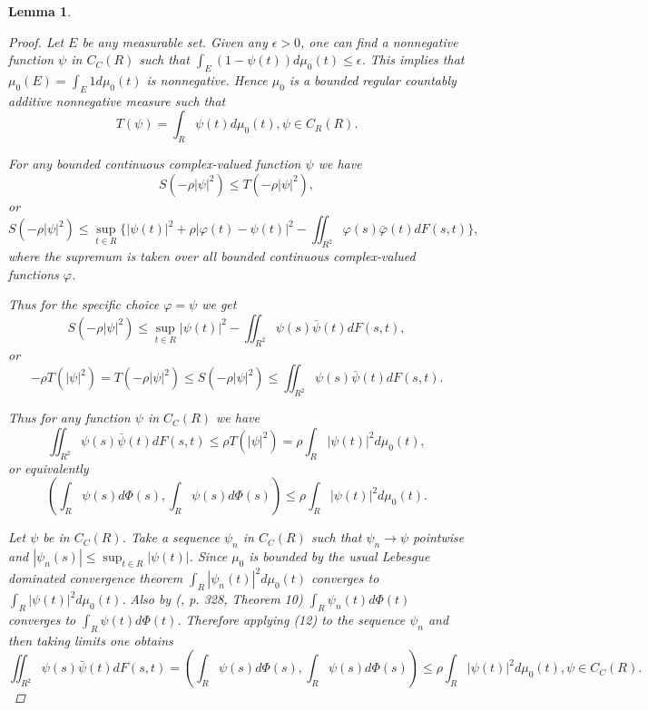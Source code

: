 \documentclass{article}
\newtheorem{lemma}[theorem]{Lemma}
\begin{document}
\begin{lemma}
\begin{enumerate}
\begin{proof}
Let $E$ be any measurable set. Given any $\epsilon > 0$, one can find a nonnegative function $\psi$ in $C_C(R)$ such that $\int_{E} (1 - \psi(t)) d\mu_0(t) \leq \epsilon$. This implies that $\mu_0(E) = \int_{E} 1 d\mu_0(t)$ is nonnegative. Hence $\mu_0$ is a bounded regular countably additive nonnegative measure such that
\begin{equation}
T(\psi) = \int_{R} \psi(t) d\mu_0(t), \psi \in C_R(R).
\end{equation}

For any bounded continuous complex-valued function $\psi$ we have
\begin{equation}
S(-\rho|\psi|^2) \leq T(-\rho|\psi|^2),
\end{equation}
or
\begin{equation}
S(-\rho|\psi|^2) \leq \sup_{t \in R} \{|\psi(t)|^2 + \rho|\varphi(t) - \psi(t)|^2 - \iint_{R^{2}} \varphi(s) \bar{\varphi}(t) d F(s, t)\},
\end{equation}
where the supremum is taken over all bounded continuous complex-valued functions $\varphi$.

Thus for the specific choice $\varphi = \psi$ we get
\begin{equation}
S(-\rho|\psi|^2) \leq \sup_{t \in R} |\psi(t)|^2 - \iint_{R^{2}} \psi(s) \bar{\psi}(t) d F(s, t),
\end{equation}
or
\begin{equation}
-\rho T(|\psi|^2) = T(-\rho|\psi|^2) \leq S(-\rho|\psi|^2) \leq \iint_{R^{2}} \psi(s) \bar{\psi}(t) d F(s, t).
\end{equation}

Thus for any function $\psi$ in $C_C(R)$ we have
\begin{equation}
\iint_{R^{2}} \psi(s) \bar{\psi}(t) d F(s, t) \leq \rho T(|\psi|^2) = \rho \int_{R} |\psi(t)|^2 d\mu_0(t),
\end{equation}
or equivalently
\begin{equation}
\left( \int_{R} \psi(s) d\Phi(s), \int_{R} \psi(s) d\Phi(s) \right) \leq \rho \int_{R} |\psi(t)|^2 d\mu_0(t).
\end{equation}

Let $\psi$ be in $C_C(R)$. Take a sequence $\psi_n$ in $C_C(R)$ such that $\psi_n \to \psi$ pointwise and $|\psi_n(s)| \leq \sup_{t \in R} |\psi(t)|$. Since $\mu_0$ is bounded by the usual Lebesgue dominated convergence theorem $\int_{R} |\psi_n(t)|^2 d\mu_0(t)$ converges to $\int_{R} |\psi(t)|^2 d\mu_0(t)$. Also by (\cite{dunford}, p. 328, Theorem 10) $\int_{R} \psi_n(t) d\Phi(t)$ converges to $\int_{R} \psi(t) d\Phi(t)$. Therefore applying (12) to the sequence $\psi_n$ and then taking limits one obtains
\begin{equation}
\iint_{R^{2}} \psi(s) \bar{\psi}(t) d F(s, t) = \left( \int_{R} \psi(s) d\Phi(s), \int_{R} \psi(s) d\Phi(s) \right) \leq \rho \int_{R} |\psi(t)|^2 d\mu_0(t), \psi \in C_C(R).
\end{equation}


\end{proof}
\end{enumerate}
\end{lemma}
\end{document}
